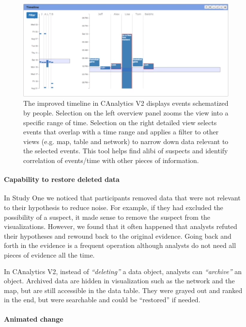 \begin{figure}
	\centering
	\includegraphics[width=\columnwidth]{03-System/img/timeline2.png}
	\caption{The improved timeline in CAnalytics V2 displays events schematized by people. Selection on the left overview panel zooms the view into a specific range of time. Selection on the right detailed view selects events that overlap with a time range and applies a filter to other views (e.g. map, table and network) to narrow down data relevant to the selected events. This tool helps find alibi of suspects and identify correlation of events/time with other pieces of information. \label{fig:timeline2}}
\end{figure}

\paragraph{Capability to restore deleted data}

In Study One we noticed that participants removed data that were not relevant to their hypothesis to reduce noise. For example, if they had excluded the possibility of a suspect, it made sense to remove the suspect from the visualizations. However, we found that it often happened that analysts refuted their hypotheses and rewound back to the original evidence. Going back and forth in the evidence is a frequent operation although analysts do not need all pieces of evidence all the time. 

In CAnalytics V2, instead of \emph{``deleting''} a data object, analysts can \emph{``archive'' } an object. Archived data are hidden in visualization such as the network and the map, but are still accessible in the data table. They were grayed out and ranked in the end, but were searchable and could be ``restored'' if needed. 

\paragraph{Animated change}

